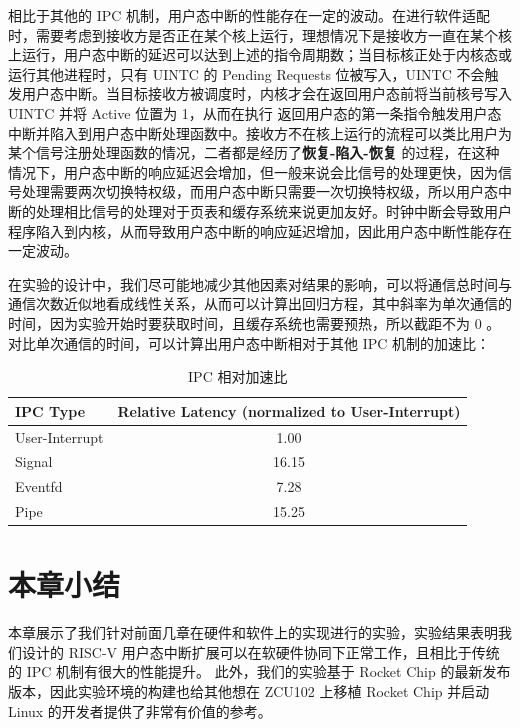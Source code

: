 相比于其他的 IPC 机制，用户态中断的性能存在一定的波动。在进行软件适配时，需要考虑到接收方是否正在某个核上运行，理想情况下是接收方一直在某个核上运行，用户态中断的延迟可以达到上述的指令周期数；当目标核正处于内核态或运行其他进程时，只有 UINTC 的 Pending Requests 位被写入，UINTC 不会触发用户态中断。当目标接收方被调度时，内核才会在返回用户态前将当前核号写入 UINTC 并将 Active 位置为 1，从而在执行 \Isret 返回用户态的第一条指令触发用户态中断并陷入到用户态中断处理函数中。接收方不在核上运行的流程可以类比用户为某个信号注册处理函数的情况，二者都是经历了\textbf{恢复-陷入-恢复} 的过程，在这种情况下，用户态中断的响应延迟会增加，但一般来说会比信号的处理更快，因为信号处理需要两次切换特权级，而用户态中断只需要一次切换特权级，所以用户态中断的处理相比信号的处理对于页表和缓存系统来说更加友好。时钟中断会导致用户程序陷入到内核，从而导致用户态中断的响应延迟增加，因此用户态中断性能存在一定波动。

在实验的设计中，我们尽可能地减少其他因素对结果的影响，可以将通信总时间与通信次数近似地看成线性关系，从而可以计算出回归方程，其中斜率为单次通信的时间，因为实验开始时要获取时间，且缓存系统也需要预热，所以截距不为 0 。对比单次通信的时间，可以计算出用户态中断相对于其他 IPC 机制的加速比：

\begin{table}
    \label{tab:latency}
    \centering
    \begin{threeparttable}[c]
        \begin{tabular}{lc}
            \toprule
            IPC Type & Relative Latency (normalized to User-Interrupt) \\
            \midrule
            User-Interrupt & 1.00 \\
            Signal & 16.15 \\
            Eventfd & 7.28 \\
            Pipe & 15.25 \\
            \bottomrule
        \end{tabular}
        \caption{IPC 相对加速比}
    \end{threeparttable}
\end{table}

\section{本章小结}

本章展示了我们针对前面几章在硬件和软件上的实现进行的实验，实验结果表明我们设计的 RISC-V 用户态中断扩展可以在软硬件协同下正常工作，且相比于传统的 IPC 机制有很大的性能提升。 此外，我们的实验基于 Rocket Chip 的最新发布版本，因此实验环境的构建也给其他想在 ZCU102 上移植 Rocket Chip 并启动 Linux 的开发者提供了非常有价值的参考。